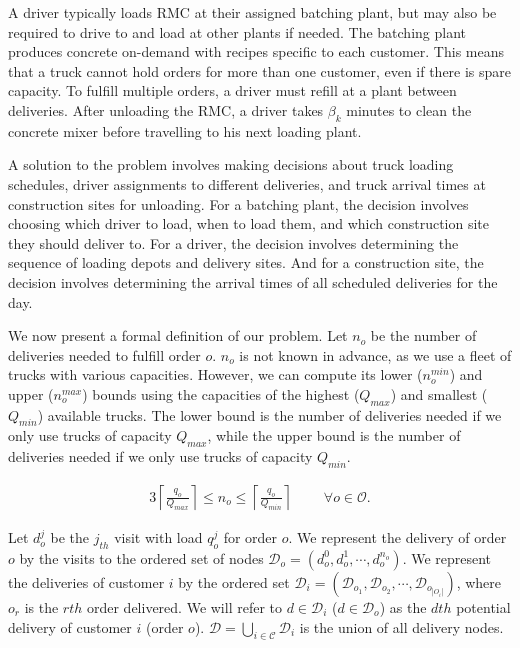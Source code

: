 \documentclass{article}
\begin{document}
A driver typically loads RMC at their assigned batching plant, but may also be required to drive to and load at other plants if needed. The batching plant produces concrete on-demand with recipes specific to each customer. This means that a truck cannot hold orders for more than one customer, even if there is spare capacity. To fulfill multiple orders, a driver must refill at a plant between deliveries. After unloading the RMC, a driver takes $\beta_k$ minutes to clean the concrete mixer before travelling to his next loading plant. %


A solution to the problem involves making decisions about truck loading schedules, driver assignments to different deliveries, and truck arrival times at construction sites for unloading. For a batching plant, the decision involves choosing which driver to load, when to load them, and which construction site they should deliver to. For a driver, the decision involves determining the sequence of loading depots and delivery sites. And for a construction site, the decision involves determining the arrival times of all scheduled deliveries for the day.

We now present a formal definition of our problem. Let $n_o$ be the number of deliveries needed to fulfill order $o$. $n_o$ is not known in advance, as we use a fleet of trucks with various capacities. However, we can compute its lower ($n_o^{min}$) and upper ($n_o^{max}$) bounds using the capacities of the highest ($Q_{max}$) and smallest ($Q_{min}$) available trucks. The lower bound is the number of deliveries needed if we only use trucks of capacity $Q_{max}$, while the upper bound is the number of deliveries needed if we only use trucks of capacity $Q_{min}$. 

\begin{alignat}{3}
    \label{mod:c1}
       \left\lceil \frac{q_o}{Q_{max}} \right\rceil \leq n_o \leq \left\lceil \frac{q_o}{Q_{min}} \right\rceil  & \text{ } & 
 \forall  o \in \mathcal{O}.
\end{alignat}

Let $d^j_{o}$ be the $j_{th}$ visit with load $q^j_{o}$ for order $o$. We represent the delivery of order $o$ by the visits to the ordered set of nodes $\mathcal{D}_o= \left(d^0_{o},d^1_{o},\cdots, d^{n_o}_{o}\right)$. We represent the deliveries of customer $i$ by the ordered set $\mathcal{D}_i= (\mathcal{D}_{o_1}, \mathcal{D}_{o_2},\cdots,\mathcal{D}_{o_{|O_i|}})$, where $o_r$ is the $rth$ order delivered. We will refer to $d \in \mathcal{D}_i$ ($d \in \mathcal{D}_o$) as the $dth$ potential delivery of customer $i$ (order $o$). $\mathcal{D}=\bigcup_{i\in \mathcal{C}} \mathcal{D}_i$ is the union of all delivery nodes. 
\end{document}
